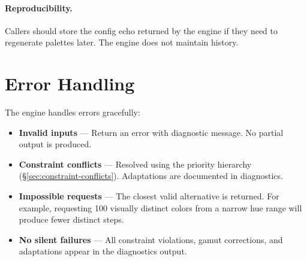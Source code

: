 \paragraph{Reproducibility.} Callers should store the config echo returned by the engine if they need to regenerate palettes later. The engine does not maintain history.

\section{Error Handling}
\label{sec:error-handling}

The engine handles errors gracefully:

\begin{itemize}
    \item \textbf{Invalid inputs} --- Return an error with diagnostic message. No partial output is produced.
    \item \textbf{Constraint conflicts} --- Resolved using the priority hierarchy (\S\ref{sec:constraint-conflicts}). Adaptations are documented in diagnostics.
    \item \textbf{Impossible requests} --- The closest valid alternative is returned. For example, requesting 100 visually distinct colors from a narrow hue range will produce fewer distinct steps.
    \item \textbf{No silent failures} --- All constraint violations, gamut corrections, and adaptations appear in the diagnostics output.
\end{itemize}
